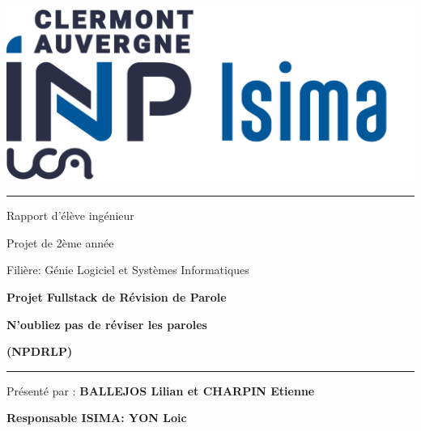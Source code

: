 \documentclass[12pt,french]{article}
\begin{document}
\begin{titlepage} %

  
  \begin{center}
  	\includegraphics[scale=0.35]{isima.png}
  \end{center}
  
  
  \vspace*{3cm} %
  
  \hrule
  
  \begin{center}
  	\large
  	Rapport d'élève ingénieur
  	
  	Projet de 2ème année
  	
  	Filière: Génie Logiciel et Systèmes Informatiques
  	
  	\huge
  	\textbf{Projet Fullstack de Révision de Parole}
  	
  	\textbf{N'oubliez pas de réviser les paroles}
  	
  	\textbf{(NPDRLP)}
  \end{center}

\hrule
  
  \vspace*{1.8cm} 
  
  \begin{center}
 
  	
  \Large Présenté par : \textbf{BALLEJOS Lilian et CHARPIN Etienne}
  
   \end{center}

\vspace*{5cm}
  
  
  
  
  	\begin{minipage}{.45\linewidth}
  		\begin{flushleft}
  			\textbf{Responsable ISIMA: YON Loic}
  			

\end{flushleft}
\end{minipage}
\end{titlepage}
\end{document}
